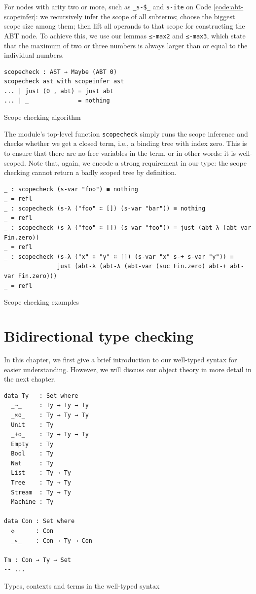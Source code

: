 For nodes with arity two or more, such as \verb$_s-$\verb=$=\verb$_$ and \verb$s-ite$ on Code \ref{code:abt-scopeinfer}: we recursively infer the scope of all subterms; choose the biggest scope size among them; then lift all operands to that scope for constructing the ABT node. To achieve this, we use our lemmas \verb$≤-max2$ and \verb$≤-max3$, which state that the maximum of two or three numbers is always larger than or equal to the individual numbers.

\begin{listing}[H]
\begin{verbatim}
scopecheck : AST → Maybe (ABT 0)
scopecheck ast with scopeinfer ast
... | just (0 , abt) = just abt
... | _              = nothing
\end{verbatim}
\caption{Scope checking algorithm}
\label{code:abt-scopecheck}
\end{listing}

The module's top-level function \verb$scopecheck$ simply runs the scope inference and checks whether we get a closed term, i.e., a binding tree with index zero. This is to ensure that there are no free variables in the term, or in other words: it is well-scoped. Note that, again, we encode a strong requirement in our type: the scope checking cannot return a badly scoped tree by definition.

\begin{listing}[H]
\begin{verbatim}
_ : scopecheck (s-var "foo") ≡ nothing
_ = refl
_ : scopecheck (s-λ ("foo" ∷ []) (s-var "bar")) ≡ nothing
_ = refl
_ : scopecheck (s-λ ("foo" ∷ []) (s-var "foo")) ≡ just (abt-λ (abt-var Fin.zero))
_ = refl
_ : scopecheck (s-λ ("x" ∷ "y" ∷ []) (s-var "x" s-+ s-var "y")) ≡
               just (abt-λ (abt-λ (abt-var (suc Fin.zero) abt-+ abt-var Fin.zero)))
_ = refl
\end{verbatim}
\caption{Scope checking examples}
\label{code:abt-scopecheck-ex}
\end{listing}

\section{Bidirectional type checking} \label{sec:typecheck}

In this chapter, we first give a brief introduction to our well-typed syntax for easier understanding. However, we will discuss our object theory in more detail in the next chapter.

\begin{listing}[H]
\begin{verbatim}
data Ty   : Set where
  _⇒_     : Ty → Ty → Ty
  _×o_    : Ty → Ty → Ty
  Unit    : Ty
  _+o_    : Ty → Ty → Ty
  Empty   : Ty
  Bool    : Ty
  Nat     : Ty
  List    : Ty → Ty
  Tree    : Ty → Ty
  Stream  : Ty → Ty
  Machine : Ty

data Con : Set where
  ◇      : Con
  _▹_    : Con → Ty → Con

Tm : Con → Ty → Set
-- ...
\end{verbatim}
\caption{Types, contexts and terms in the well-typed syntax}
\label{code:typecheck-ty}
\end{listing}

